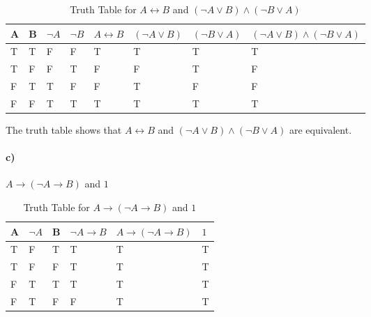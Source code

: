 \documentclass[12pt]{article}
\begin{document}
\begin{table}[H]
    \centering
    \begin{tabular}{|l|l|l|l|l|l|l|l|}
        \hline
        A & B & $\neg A$ & $\neg B$ & $ A \leftrightarrow B $ & $ (\neg A \vee B) $ & $ (\neg B \vee A) $ & $ (\neg A \vee B) \wedge (\neg B \vee A) $ \\ \hline
        T & T & F        & F        & T                       & T                   & T                   & T                                          \\ \hline
        T & F & F        & T        & F                       & F                   & T                   & F                                          \\ \hline
        F & T & T        & F        & F                       & T                   & F                   & F                                          \\ \hline
        F & F & T        & T        & T                       & T                   & T                   & T                                          \\ \hline
    \end{tabular}

    \caption{Truth Table for $ A \leftrightarrow B $ and $ (\neg A \vee B) \wedge (\neg B \vee A) $}
    \label{t2}
\end{table}

The truth table shows that $ A \leftrightarrow B $ and $ (\neg A \vee B) \wedge (\neg B \vee A) $ are equivalent.

\paragraph{c)} $ A \rightarrow (\neg A \rightarrow B) $ and $ 1 $

\begin{table}[H]
    \centering
    \begin{tabular}{|l|l|l|l|l|l|}
        \hline
        A & $\neg A$ & B & $ \neg A \rightarrow B $ & $ A \rightarrow (\neg A \rightarrow B) $ & $ 1 $ \\ \hline
        T & F        & T & T                        & T                                        & T     \\ \hline
        T & F        & F & T                        & T                                        & T     \\ \hline
        F & T        & T & T                        & T                                        & T     \\ \hline
        F & T        & F & F                        & T                                        & T     \\ \hline
    \end{tabular}

    \caption{Truth Table for $ A \rightarrow (\neg A \rightarrow B) $ and $ 1 $}
    \label{t3}
\end{table}
\end{document}
